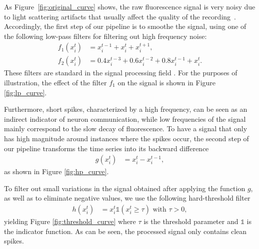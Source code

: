 \documentclass[wcp]{jmlr}
\begin{document}
As Figure~\ref{fig:original_curve} shows, the raw
fluorescence signal is very noisy due to light scattering artifacts that
usually affect the quality of the recording~\citep{lichtman2011big}.
Accordingly, the first step of our pipeline is to smoothe the signal, using
one of the following low-pass filters for filtering out high frequency noise:
\begin{align}
f_1(x^t_i) &= x^{t-1}_i + x^t_i + x^{t+1}_i, \label{eq:symetric-median} \\
f_2(x^t_i) &= 0.4 x^{t-3}_i + 0.6 x^{t-2}_i + 0.8 x^{t-1}_i + x_i^t.
\label{eq:weighted-asymetric-median}
\end{align}
These filters are standard in the signal processing field \citep{kaiser1977data, oppenheim1983signals}. For the purposes of illustration, the effect of the filter $f_1$ on the signal
is shown in Figure \ref{fig:lp_curve}.

Furthermore, short spikes, characterized by a high
frequency, can be seen as an indirect indicator of neuron communication, while low frequencies of the signal mainly correspond to the slow
decay of fluorescence. To have a signal that only has high magnitude around instances where the spikes occur, the second step of our pipeline transforms the time series into its backward
difference
\begin{align}
g(x^{t}_{i}) &= x^{t}_i - x^{t-1}_i, \label{eq:high-pass-filter}
\end{align}
as shown in Figure \ref{fig:hp_curve}.

To filter out small variations in the signal obtained after applying the
function $g$, as well as to eliminate negative values, we use the following
hard-threshold filter
\begin{align}\label{eqn:hfilter}
h(x^{t}_i) &= x^{t}_i \mathbb{1}(x^{t}_i \geq \tau) \text{ with } \tau > 0,
\end{align}
yielding Figure \ref{fig:threshold_curve} where $\tau$ is the threshold parameter and $\mathbb{1}$ is the indicator function.
As can be seen, the processed signal only contains clean spikes.
\end{document}
